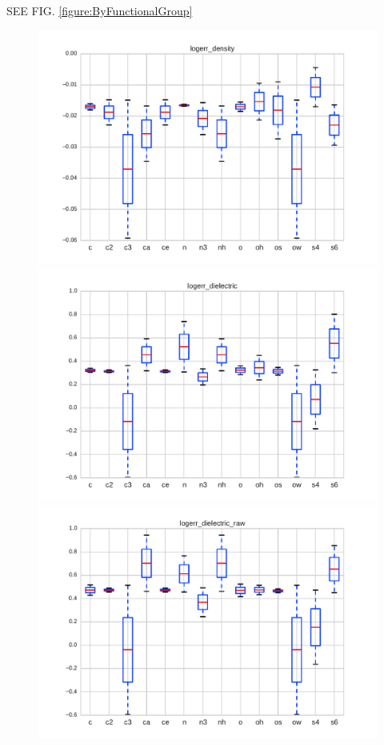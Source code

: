 \documentclass[aps,pre,twocolumn,nofootinbib,superscriptaddress,linenumbers]{revtex4-1}
\begin{document}
SEE FIG. \ref{figure:ByFunctionalGroup}


\begin{figure}

\includegraphics[width=\columnwidth]{./figures/functional_group_logerr_density.pdf}

\includegraphics[width=\columnwidth]{./figures/functional_group_logerr_dielectric.pdf}

\includegraphics[width=\columnwidth]{./figures/functional_group_logerr_dielectric_raw.pdf}


\end{figure}
\end{document}
